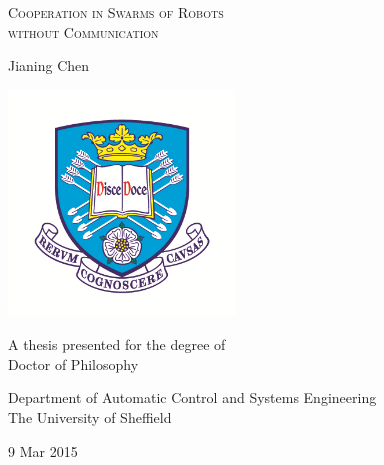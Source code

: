

\begin{titlepage}
\begin{center}

	\vspace*{0.5cm}
	
	{\Large\textsc{Cooperation in Swarms of Robots\\without Communication}}
	
	\vspace{1.0cm}
	
	{\large Jianing Chen}
	
	\vspace{1.5cm}
	
	\includegraphics[width=6.0cm]{tuoslogo_emblem.png}
	
	\vspace{1.0cm}
	
	{\large A thesis presented for the degree of\\Doctor of Philosophy}
	
	\vspace{1.0cm}
	
	
	{\large Department of Automatic Control and Systems Engineering}\\
	\vspace{0.5cm}
	{\large The University of Sheffield}\\
	
	\vfill
	
	{\large 9 Mar 2015}
	
\end{center}
\end{titlepage}

